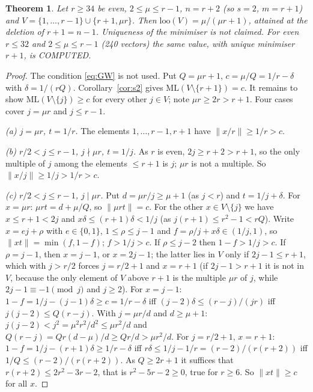 \documentclass[11pt]{article}
\newtheorem{thm}{Theorem}
\theoremstyle{remark}
\newcommand{\norm}[1]{\lVert #1\rVert}
\newcommand{\ML}{\mathrm{ML}}
\newcommand{\loo}{\mathrm{loo}}
\begin{document}
\begin{thm}\label{thm:A}
Let $r\ge34$ be even, $2\le\mu\le r-1$, $n=r+2$ (so $s=2$, $m=r+1$) and $V=\{1,\dots,r-1\}\cup\{r+1,\mu r\}$. Then $\loo(V)=\mu/(\mu r+1)$, attained at the deletion of $r+1=n-1$. Uniqueness of the minimiser is not claimed. For even $r\le32$ and $2\le\mu\le r-1$ (240 vectors) the same value, with unique minimiser $r+1$, is COMPUTED.
\end{thm}
\begin{proof}
The condition \eqref{eq:GW} is not used. Put $Q=\mu r+1$, $c=\mu/Q=1/r-\delta$ with $\delta=1/(rQ)$. Corollary~\ref{cor:s2} gives $\ML(V\setminus\{r+1\})=c$. It remains to show $\ML(V\setminus\{j\})\ge c$ for every other $j\in V$; note $\mu r\ge2r>r+1$. Four cases cover $j=\mu r$ and $j\le r-1$.

\emph{(a) $j=\mu r$, $t=1/r$.} The elements $1,\dots,r-1,r+1$ have $\norm{x/r}\ge1/r>c$.

\emph{(b) $r/2<j\le r-1$, $j\nmid\mu r$, $t=1/j$.} As $r$ is even, $2j\ge r+2>r+1$, so the only multiple of $j$ among the elements $\le r+1$ is $j$; $\mu r$ is not a multiple. So $\norm{x/j}\ge1/j>1/r>c$.

\emph{(c) $r/2<j\le r-1$, $j\mid\mu r$.} Put $d=\mu r/j\ge\mu+1$ (as $j<r$) and $t=1/j+\delta$. For $x=\mu r$: $\mu rt=d+\mu/Q$, so $\norm{\mu rt}=c$. For the other $x\in V\setminus\{j\}$ we have $x\le r+1<2j$ and $x\delta\le(r+1)\delta<1/j$ (as $j(r+1)\le r^2-1<rQ$). Write $x=ej+\rho$ with $e\in\{0,1\}$, $1\le\rho\le j-1$ and $f=\rho/j+x\delta\in(1/j,1)$, so $\norm{xt}=\min(f,1-f)$; $f>1/j>c$. If $\rho\le j-2$ then $1-f>1/j>c$. If $\rho=j-1$, then $x=j-1$, or $x=2j-1$; the latter lies in $V$ only if $2j-1\le r+1$, which with $j>r/2$ forces $j=r/2+1$ and $x=r+1$ (if $2j-1>r+1$ it is not in $V$, because the only element of $V$ above $r+1$ is the multiple $\mu r$ of $j$, while $2j-1\equiv-1\pmod j$ and $j\ge2$). For $x=j-1$: $1-f=1/j-(j-1)\delta\ge c=1/r-\delta$ iff $(j-2)\delta\le(r-j)/(jr)$ iff $j(j-2)\le Q(r-j)$. With $j=\mu r/d$ and $d\ge\mu+1$: $j(j-2)<j^2=\mu^2r^2/d^2\le\mu r^2/d$ and $Q(r-j)=Qr(d-\mu)/d\ge Qr/d>\mu r^2/d$. For $j=r/2+1$, $x=r+1$: $1-f=1/j-(r+1)\delta\ge1/r-\delta$ iff $r\delta\le1/j-1/r=(r-2)/(r(r+2))$ iff $1/Q\le(r-2)/(r(r+2))$. As $Q\ge2r+1$ it suffices that $r(r+2)\le2r^2-3r-2$, that is $r^2-5r-2\ge0$, true for $r\ge6$. So $\norm{xt}\ge c$ for all $x$.


\end{proof}
\end{document}
